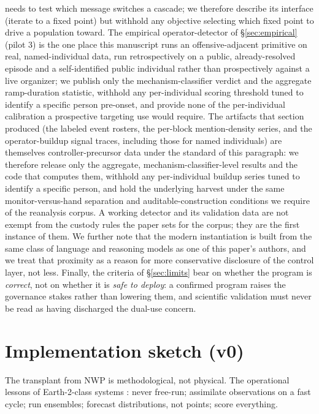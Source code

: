 \documentclass[11pt]{article}
\begin{document}
needs to test which message switches a cascade; we therefore describe its interface (iterate to a fixed point) but withhold any objective selecting which fixed point to drive a population toward. The empirical operator-detector of \S\ref{sec:empirical} (pilot 3) is the one place this manuscript runs an offensive-adjacent primitive on real, named-individual data, run retrospectively on a public, already-resolved episode and a self-identified public individual rather than prospectively against a live organizer; we publish only the mechanism-classifier verdict and the aggregate ramp-duration statistic, withhold any per-individual scoring threshold tuned to identify a specific person pre-onset, and provide none of the per-individual calibration a prospective targeting use would require. The artifacts that section produced (the labeled event rosters, the per-block mention-density series, and the operator-buildup signal traces, including those for named individuals) are themselves controller-precursor data under the standard of this paragraph: we therefore release only the aggregate, mechanism-classifier-level results and the code that computes them, withhold any per-individual buildup series tuned to identify a specific person, and hold the underlying harvest under the same monitor-versus-hand separation and auditable-construction conditions we require of the reanalysis corpus. A working detector and its validation data are not exempt from the custody rules the paper sets for the corpus; they are the first instance of them. We further note that the modern instantiation is built from the same class of language and reasoning models as one of this paper's authors, and we treat that proximity as a reason for more conservative disclosure of the control layer, not less. Finally, the criteria of \S\ref{sec:limits} bear on whether the program is \emph{correct}, not on whether it is \emph{safe to deploy}: a confirmed program raises the governance stakes rather than lowering them, and scientific validation must never be read as having discharged the dual-use concern.

\section{Implementation sketch (v0)}
\label{sec:implementation}

The transplant from NWP is methodological, not physical. The operational lessons of Earth-2-class systems \cite{pathak2022}: never free-run; assimilate observations on a fast cycle; run ensembles; forecast distributions, not points; score everything.
\end{document}
